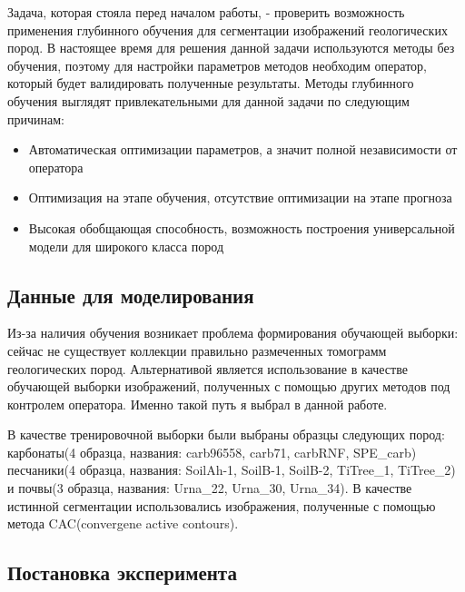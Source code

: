 \documentclass[14pt, a4paper, oneside, bold]{extarticle}
\begin{document}
Задача, которая стояла перед началом работы, - проверить возможность применения глубинного обучения для сегментации изображений геологических пород. В настоящее время для решения данной задачи используются методы без обучения, поэтому для настройки параметров методов необходим оператор, который будет валидировать полученные результаты.
Методы глубинного обучения выглядят привлекательными для данной задачи по следующим причинам:
\begin{itemize}
	\item Автоматическая оптимизации параметров, а значит полной 	независимости от оператора
	
	\item Оптимизация на этапе обучения, отсутствие оптимизации на этапе прогноза 
	
	\item Высокая обобщающая способность, возможность построения универсальной модели для широкого класса пород
	
\end{itemize}
 
\subsection{Данные для моделирования}

Из-за наличия обучения возникает проблема формирования обучающей выборки: сейчас не существует коллекции правильно размеченных томограмм геологических пород. Альтернативой является использование в качестве обучающей выборки изображений, полученных с помощью других методов под контролем оператора. Именно такой путь я выбрал в данной работе.

В качестве тренировочной выборки были выбраны образцы следующих пород: карбонаты(4 образца, названия: carb96558, carb71, carbRNF, SPE\_carb)  песчаники(4 образца, названия: SoilAh-1, SoilB-1, SoilB-2, TiTree\_1, TiTree\_2) и почвы(3 образца, названия: Urna\_22, Urna\_30, Urna\_34). В	качестве истинной сегментации использовались изображения, полученные с помощью метода CAC(convergene active contours).


\subsection{Постановка эксперимента}
\end{document}
